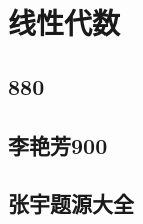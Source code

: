 \documentclass[12pt, a4paper, oneside, UTF8]{ctexbook}
\begin{document}
% 
\else
\fi
\chapter{线性代数}
\section{880}

\section{李艳芳900}

\section{张宇题源大全}
\ifx\allfiles\undefined
\end{document}
